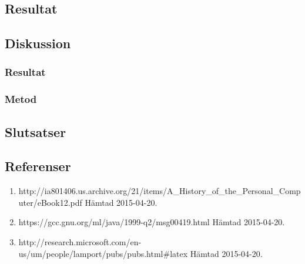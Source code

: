\subsection{Resultat}
\subsection{Diskussion}
\subsubsection{Resultat}
\subsubsection{Metod}
\subsection{Slutsatser}
\subsection{Referenser}
\begin{enumerate}
\item http://ia801406.us.archive.org/21/items/A\_History\_of\_the\_Personal\_Computer/eBook12.pdf Hämtad 2015-04-20.
\item https://gcc.gnu.org/ml/java/1999-q2/msg00419.html Hämtad 2015-04-20.
\item http://research.microsoft.com/en-us/um/people/lamport/pubs/pubs.html\#latex Hämtad 2015-04-20.
\end{enumerate}